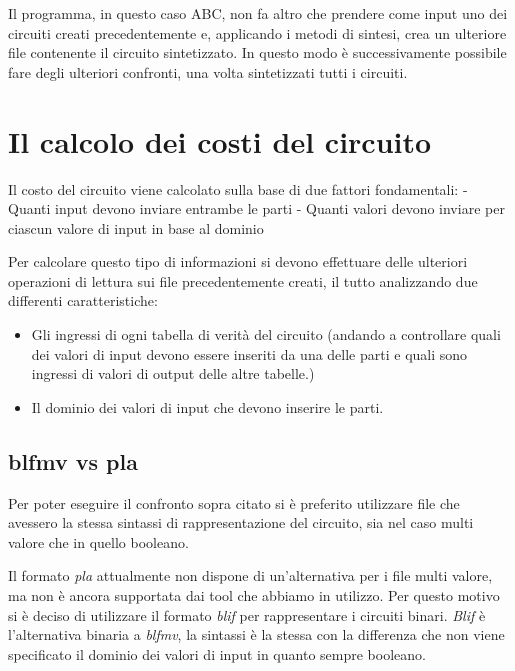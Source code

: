 \documentclass[italian,]{book}
\providecommand{\tightlist}{%
  \setlength{\itemsep}{0pt}\setlength{\parskip}{0pt}}
\begin{document}
Il programma, in questo caso ABC, non fa altro che prendere come input uno dei circuiti creati precedentemente e, applicando i metodi di sintesi, crea un ulteriore file contenente il circuito sintetizzato. In questo modo è successivamente possibile fare degli ulteriori confronti, una volta sintetizzati tutti i circuiti.

\hypertarget{il-calcolo-dei-costi-del-circuito}{%
\section{Il calcolo dei costi del circuito}\label{il-calcolo-dei-costi-del-circuito}}

Il costo del circuito viene calcolato sulla base di due fattori fondamentali:
- Quanti input devono inviare entrambe le parti
- Quanti valori devono inviare per ciascun valore di input in base al dominio

Per calcolare questo tipo di informazioni si devono effettuare delle ulteriori operazioni di lettura sui file precedentemente creati, il tutto analizzando due differenti caratteristiche:

\begin{itemize}
\tightlist
\item
  Gli ingressi di ogni tabella di verità del circuito (andando a controllare quali dei valori di input devono essere inseriti da una delle parti e quali sono ingressi di valori di output delle altre tabelle.)
\item
  Il dominio dei valori di input che devono inserire le parti.
\end{itemize}

\newpage

\hypertarget{blfmv-vs-pla}{%
\subsection{blfmv vs pla}\label{blfmv-vs-pla}}

Per poter eseguire il confronto sopra citato si è preferito utilizzare file che avessero la stessa sintassi di rappresentazione del circuito, sia nel caso multi valore che in quello booleano.

Il formato \emph{pla} attualmente non dispone di un'alternativa per i file multi valore, ma non è ancora supportata dai tool che abbiamo in utilizzo. Per questo motivo si è deciso di utilizzare il formato \emph{blif} per rappresentare i circuiti binari. \emph{Blif} è l'alternativa binaria a \emph{blfmv}, la sintassi è la stessa con la differenza che non viene specificato il dominio dei valori di input in quanto sempre booleano.
\end{document}
